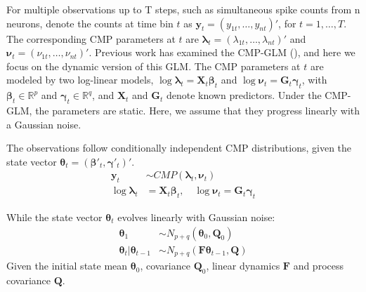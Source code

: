 \documentclass[aoas]{imsart}
\theoremstyle{plain}
\theoremstyle{remark}
\begin{document}
For multiple observations up to T steps, such as simultaneous spike counts from n neurons, denote the counts at time bin $t$ as $\bm{y}_t = (y_{1t},\ldots,y_{nt})'$, for $t=1,\ldots, T$. The corresponding CMP parameters at $t$ are $\bm{\lambda}_t = (\lambda_{1t},\ldots,\lambda_{nt})'$ and $\bm{\nu}_t = (\nu_{1t},\ldots,\nu_{nt})'$. Previous work has examined the CMP-GLM (\cite{Chatla2018,Sellers2010}), and here we focus on the dynamic version of this GLM. The CMP parameters at $t$ are modeled by two log-linear models, $\log\bm{\lambda}_t = \bm{X}_t\bm{\beta}_t$ and $\log\bm{\nu}_t = \bm{G}_t\bm{\gamma}_t$, with $\bm{\beta}_t \in \mathbb{R}^p$ and $\bm{\gamma}_t \in \mathbb{R}^q$, and $\bm{X}_t$ and $\bm{G}_t$ denote known predictors. Under the CMP-GLM, the parameters are static. Here, we assume that they  progress linearly with a Gaussian noise.

The observations follow conditionally independent CMP distributions, given the state vector $\bm{\theta}_t = (\bm{\beta}'_t, \bm{\gamma}'_t)'$. 
\begin{align}
	\bm{y}_t &\sim CMP(\bm{\lambda}_t, \bm{\nu}_t)\\
	\log\bm{\lambda}_t &= \bm{X}_t\bm{\beta}_t, \quad \log\bm{\nu}_t = \bm{G}_t\bm{\gamma}_t \nonumber
\end{align}

While the state vector  $\bm{\theta}_t$ evolves linearly with Gaussian noise:
\begin{align}
	\bm{\theta}_1 &\sim N_{p+q}(\bm{\theta}_0, \bm{Q}_0)\\
	\bm{\theta}_t|\bm{\theta}_{t-1} &\sim N_{p+q}(\bm{F\theta}_{t-1}, \bm{Q}) \nonumber
\end{align}
Given the initial state mean $\bm{\theta}_0$, covariance $\bm{Q}_0$, linear dynamics $\bm{F}$ and process covariance $\bm{Q}$.
\end{document}
